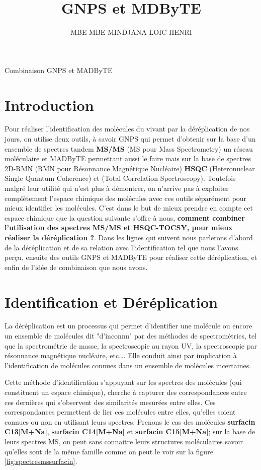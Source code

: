 \documentclass[12pt, french, latin.medieval, a4paper]{report}
\author{MBE MBE MINDJANA LOIC HENRI}
\title{GNPS et MDByTE}
\begin{document}
    
    \pagecouverture
    {Combinaison GNPS et MADByTE}
    {}
    \tableofcontents
    \vspace{20cm}
    
    \section{Introduction}
        Pour réaliser l'identification des molécules du vivant par la déréplication de nos jours, on utilise deux outils, à savoir GNPS qui permet d'obtenir sur la base d'un ensemble de spectres tandem \textbf{MS/MS} (MS pour Mass Spectrometry) un réseau moléculaire et MADByTE permettant aussi le faire mais sur la base de spectres 2D-RMN (RMN pour Résonnance Magnétique Nucléaire) \textbf{HSQC} (Heteronuclear Single Quantum Coherence) et  (Total Correlation Spectroscopy). Toutefois malgré leur utilité qui n’est plus à démontrer, on n’arrive pas à exploiter complètement l’espace chimique des molécules avec ces outils séparément pour mieux identifier les molécules. C’est dans le but de mieux prendre en compte cet espace chimique que la question suivante s’offre à nous, \textbf{comment combiner l'utilisation des spectres MS/MS et HSQC-TOCSY, pour mieux réaliser la déréplication ?}. Dans les lignes qui suivent nous parlerons d'abord de la déréplication et de sa relation avec l’identification tel que nous l'avons perçu, ensuite des outils GNPS et MADByTE pour réaliser cette déréplication, et enfin de l’idée de combinaison que nous avons.

    \section{Identification et Déréplication}

        La déréplication est un processus qui permet d'identifier une molécule ou encore un ensemble de molécules dit "d’inconnu" par des méthodes de spectrométries, tel que la spectrométrie de masse, la spectroscopie au rayon UV, la spectroscopie par résonnance magnétique nucléaire, etc…. Elle conduit ainsi par implication à l’identification de molécules connues dans un ensemble de molécules incertaines. 

        Cette méthode d’identification s’appuyant sur les spectres des molécules (qui constituent un espace chimique), cherche à capturer des correspondances entre ces dernières qui s’observent des similarités mesurées entre elles. Ces correspondances permettent de lier ces molécules entre elles, qu’elles soient connues ou non en utilisant leurs spectres. Prenons le cas des molécules \textbf{surfacin C13[M+Na]}, \textbf{surfacin C14[M+Na]} et \textbf{surfacin C15[M+Na]}; sur la base de leurs spectres MS, on peut sans connaitre leurs structures moléculaires savoir qu’elles sont de la même famille comme on peut le voir sur la figure \ref{fig:spectresmssurfacin}.
        
\end{document}
